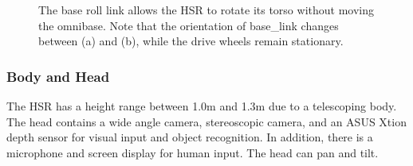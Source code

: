 \documentclass[12pt]{article}
\begin{document}
            \begin{figure}[ht]
                \centering
                \quad
                \caption{The base roll link allows the HSR to rotate its torso without moving the omnibase. Note that the orientation of base\_link changes between (a) and (b), while the drive wheels remain stationary.}
                \label{fig:base_roll_fig}
            \end{figure}
        
    
        \subsubsection{Body and Head} 
            The HSR has a height range between 1.0m and 1.3m due to a telescoping body. The head contains a wide angle camera, stereoscopic camera, and an ASUS Xtion depth sensor for visual input and object recognition. In addition, there is a microphone and screen display for human input. The head can pan and tilt.
\end{document}
